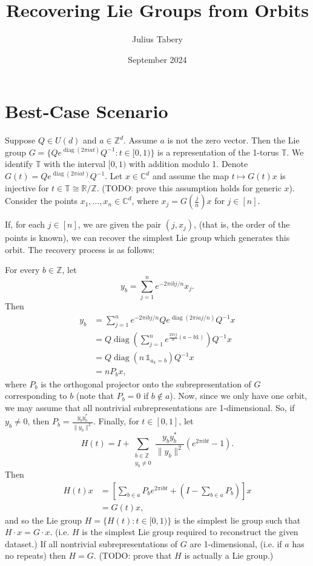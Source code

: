 \documentclass[reqno]{amsart}
\title{Recovering Lie Groups from Orbits}
\author{Julius Tabery}
\date{September 2024}
\DeclareMathOperator{\diag}{diag}
\begin{document}
\maketitle

\section{Best-Case Scenario}
Suppose $Q \in U(d)$ and $a \in \mathbb{Z}^d$.
Assume $a$ is not the zero vector.
Then the Lie group $G = \{Qe^{\diag(2\pi i a t)} Q^{-1} : t \in [0,1)\}$ is a representation of the 1-torus $\mathbb{T}$.
We identify $\mathbb{T}$ with the interval $[0,1)$ with addition modulo 1.
Denote $G(t) = Qe^{\diag(2\pi i a t)} Q^{-1}$.
Let $x \in \mathbb{C}^d$ and assume the map $t \mapsto G(t) x$ is injective for $t \in \mathbb{T} \cong \mathbb{R} / \mathbb{Z}$.
(TODO: prove this assumption holds for generic $x$).
Consider the points $x_1, \dots, x_n \in \mathbb{C}^d$, where  $x_j = G(\frac{j}{n})x$ for $j \in [n]$.


If, for each $j \in [n]$, we are given the pair $(j, x_j)$, (that is, the order of the points is known), we can recover the simplest Lie group which generates this orbit.
The recovery process is as follows:

For every $b \in \mathbb{Z}$, let 
\[
y_b = \sum_{j=1}^n e^{-2\pi ibj/n}x_j.
\]
Then
\begin{align*}
    y_b
    &=
    \sum_{j=1}^n e^{-2\pi ibj/n} Q e^{\diag(2\pi iaj/n)}Q^{-1}x
    \\&=
    Q\diag\left(
    \sum_{j=1}^n e^{\frac{2\pi i j}{n} (a - b\mathds{1})}
    \right)Q^{-1}x
    \\&=
    Q \diag\left( n\, \mathds{1}_{a_k= b} \right)Q^{-1}x
    \\&=
    n P_b x,
\end{align*}
where $P_b$ is the orthogonal projector onto the subrepresentation of $G$ corresponding to $b$ (note that $P_b=0$ if $b \notin a$).
Now, since we only have one orbit, we may assume that all nontrivial subrepresentations are 1-dimensional.
So, if $y_b \neq 0$, then $P_b = \frac{y_b y_b^*}{\|y_b\|^2}$.
Finally, for $t \in [0,1]$, let 
\[
    H(t)
    =
    I +\sum_{\substack{b \in \mathbb{Z} \\ y_b \neq 0}} 
    \frac{y_b y_b^*}{\|y_b\|^2}(e^{2\pi ibt} -1).
\]
Then
\begin{align*}
    H(t)x
    &=
    \left[\sum_{b \in a} 
    P_b e^{2\pi ibt}
    + \left( I - \sum_{b \in a}
    P_b \right)\right]x
    \\&= G(t)x,
\end{align*}
and so the Lie group $H=\{H(t): t \in [0,1)\}$ is the simplest lie group such that $H \cdot x = G \cdot x$.
(i.e. $H$ is the simplest Lie group required to reconstruct the given dataset.)
If all nontrivial subrepresentations of $G$ are 1-dimensional, (i.e. if $a$ has no repeats) then $H=G$.
(TODO: prove that $H$ is actually a Lie group.)
\end{document}
